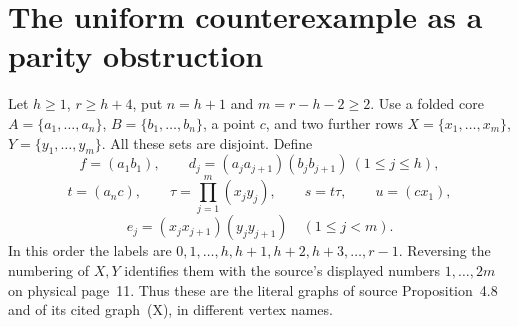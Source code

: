 \documentclass[a4paper,11pt]{article}
\begin{document}
\section{The uniform counterexample as a parity obstruction}
Let $h\geq1$, $r\geq h+4$, put $n=h+1$ and $m=r-h-2\geq2$.
Use a folded core $A=\{a_1,\ldots,a_n\}$,
$B=\{b_1,\ldots,b_n\}$, a point $c$, and two further rows
$X=\{x_1,\ldots,x_m\}$, $Y=\{y_1,\ldots,y_m\}$.
All these sets are disjoint. Define
\[
 f=(a_1b_1),\qquad d_j=(a_ja_{j+1})(b_jb_{j+1})\ (1\leq j\leq h),
\]
\[
 t=(a_nc),\qquad \tau=\prod_{j=1}^{m}(x_jy_j),\qquad
 s=t\tau,\qquad u=(cx_1),
\]
\[
 e_j=(x_jx_{j+1})(y_jy_{j+1})\quad(1\leq j<m).
\]
In this order the labels are $0,1,\ldots,h,h+1,h+2,h+3,\ldots,r-1$.
Reversing the numbering of $X,Y$ identifies them with the source's displayed
numbers $1,\ldots,2m$ on physical page~11. Thus these are the literal graphs
of source Proposition~4.8 and of its cited graph~(X), in different vertex names.
\end{document}
